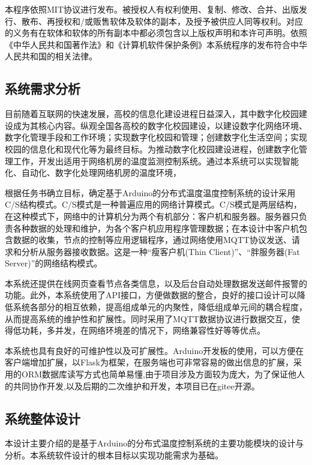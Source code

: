 本程序依照MIT协议进行发布。被授权人有权利使用、复制、修改、合并、出版发行、散布、再授权和/或贩售软体及软体的副本，及授予被供应人同等权利。对应的义务有在软体和软体的所有副本中都必须包含以上版权声明和本许可声明。依照《中华人民共和国著作法》和《计算机软件保护条例》本系统程序的发布符合中华人民共和国的相关法律。

\subsection{系统需求分析}

目前随着互联网的快速发展，高校的信息化建设进程日益深入，其中数字化校园建设成为其核心内容。纵观全国各高校的数字化校园建设，以建设数字化网络环境、数字化管理手段和工作环境；实现数字化校园和管理；创建数字化生活空间；实现校园的信息化和现代化等为最终目标。为推动数字化校园建设进程，创建数字化管理工作，开发出适用于网络机房的温度监测控制系统。通过本系统可以实现智能化、自动化、数字化处理网络机房的温度环境，


根据任务书确立目标，确定基于Arduino的分布式温度温度控制系统的设计采用C/S结构模式。C/S模式是一种普遍应用的网络计算模式。C/S模式是两层结构，在这种模式下，网络中的计算机分为两个有机部分：客户机和服务器。服务器只负责各种数据的处理和维护，为各个客户机应用程序管理数据；在本设计中客户机包含数据的收集，节点的控制等应用逻辑程序，通过网络使用MQTT协议发送、请求和分析从服务器接收数据。这是一种“瘦客户机(Thin Client)”、“胖服务器(Fat Server)”的网络结构模式。

本系统还提供在线网页查看节点各类信息，以及后台自动处理数据发送邮件报警的功能。此外，本系统使用了API接口，方便做数据的整合，良好的接口设计可以降低系统各部分的相互依赖，提高组成单元的内聚性，降低组成单元间的耦合程度，从而提高系统的维护性和扩展性。同时采用了MQTT数据协议进行数据交互，使得低功耗，多并发，在网络环境差的情况下，网络兼容性好等等优点。

本系统也具有良好的可维护性以及可扩展性。Arduino开发板的使用，可以方便在客户端增加扩展，以Flask为框架，在服务端也可非常容易的做出信息的扩展，采用的ORM数据库读写方式也简单易懂,由于项目涉及方面较为庞大，为了保证他人的共同协作开发,以及后期的二次维护和开发，本项目已在gitee开源。

\subsection{系统整体设计}

本设计主要介绍的是基于Arduino的分布式温度控制系统的主要功能模块的设计与分析。本系统软件设计的根本目标以实现功能需求为基础。

